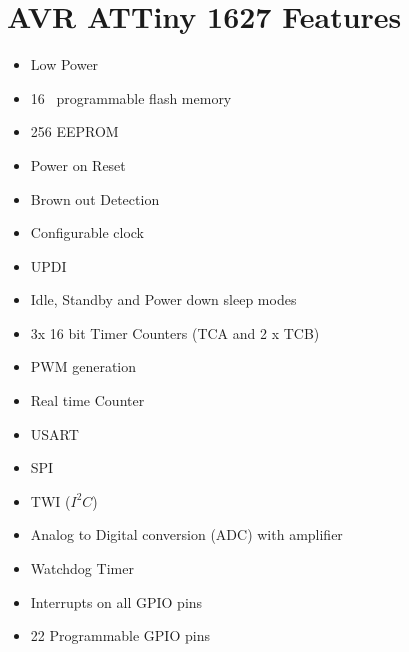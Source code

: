 \documentclass[11pt,a4paper,titlepage]{report}
\begin{document}
	\section{AVR ATTiny 1627 Features}\label{appendix:attiny_features}
	\begin{itemize}
		\item Low Power
		\item 16\unit{\kilo\byte} programmable flash memory
		\item 256\unit{\byte} EEPROM
		\item Power on Reset
		\item Brown out Detection
		\item Configurable clock
		\item UPDI
		\item Idle, Standby and Power down sleep modes
		\item 3x 16 bit Timer Counters (TCA and 2 x TCB)
		\item PWM generation
		\item Real time Counter
		\item USART
		\item SPI
		\item TWI ($I^{2}C$)
		\item Analog to Digital conversion (ADC) with amplifier
		\item Watchdog Timer
		\item Interrupts on all GPIO pins
		\item 22 Programmable GPIO pins
	\end{itemize}
	
\end{document}
